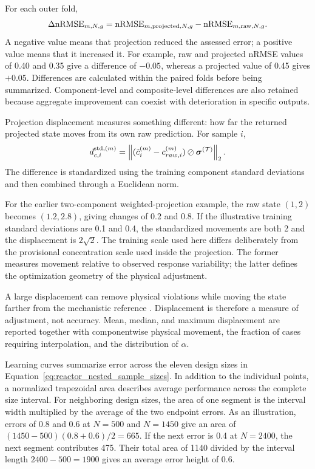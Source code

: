 For each outer fold,
\begin{equation}
\equationname{Paired difference in projected and raw prediction error}
\Delta\mathrm{nRMSE}_{m,N,g}=
\mathrm{nRMSE}_{m,\mathrm{projected},N,g}
-\mathrm{nRMSE}_{m,\mathrm{raw},N,g}.
\label{eq:projection_paired_error_difference}
\end{equation}
A negative value means that projection reduced the assessed error; a positive value means that it increased it. For example, raw and projected nRMSE values of 0.40 and 0.35 give a difference of $-0.05$, whereas a projected value of 0.45 gives $+0.05$. Differences are calculated within the paired folds before being summarized. Component-level and composite-level differences are also retained because aggregate improvement can coexist with deterioration in specific outputs.

Projection displacement measures something different: how far the returned projected state moves from its own raw prediction. For sample $i$,
\begin{equation}
\equationname{Standardized component displacement caused by projection}
d_{c,i}^{\mathrm{std},(m)}=
\left\|(\tilde c_i^{(m)}-c_{raw,i}^{(m)})
\oslash\boldsymbol{\sigma}^{(\mathcal{T})}\right\|_2.
\label{eq:projection_standardized_displacement}
\end{equation}
The difference is standardized using the training component standard deviations and then combined through a Euclidean norm.

For the earlier two-component weighted-projection example, the raw state $(1,2)$ becomes $(1.2,2.8)$, giving changes of 0.2 and 0.8. If the illustrative training standard deviations are 0.1 and 0.4, the standardized movements are both 2 and the displacement is
$2\sqrt2$.
The training scale used here differs deliberately from the provisional concentration scale used inside the projection. The former measures movement relative to observed response variability; the latter defines the optimization geometry of the physical adjustment.

A large displacement can remove physical violations while moving the state farther from the mechanistic reference \citep{SturmSilva2024,KircherVotsmeier2025}. Displacement is therefore a measure of adjustment, not accuracy. Mean, median, and maximum displacement are reported together with componentwise physical movement, the fraction of cases requiring interpolation, and the distribution of $\alpha$.

Learning curves summarize error across the eleven design sizes in Equation~\eqref{eq:reactor_nested_sample_sizes}. In addition to the individual points, a normalized trapezoidal area describes average performance across the complete size interval. For neighboring design sizes, the area of one segment is the interval width multiplied by the average of the two endpoint errors. As an illustration, errors of 0.8 and 0.6 at $N=500$ and $N=1450$ give an area of
$(1450-500)(0.8+0.6)/2=665$.
If the next error is 0.4 at $N=2400$, the next segment contributes 475. Their total area of 1140 divided by the interval length $2400-500=1900$ gives an average error height of 0.6.

